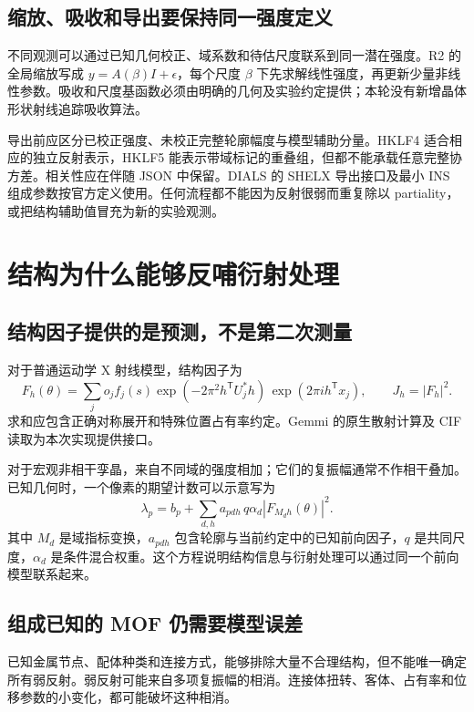 \documentclass[UTF8,11pt,a4paper,fontset=fandol]{ctexart}
\newcommand{\T}{^{\mathsf T}}
\begin{document}
\subsection{缩放、吸收和导出要保持同一强度定义}

不同观测可以通过已知几何校正、域系数和待估尺度联系到同一潜在强度。R2 的全局缩放写成 $y=A(\beta)I+\epsilon$，每个尺度 $\beta$ 下先求解线性强度，再更新少量非线性参数。吸收和尺度基函数必须由明确的几何及实验约定提供；本轮没有新增晶体形状射线追踪吸收算法。

导出前应区分已校正强度、未校正完整轮廓幅度与模型辅助分量。HKLF4 适合相应的独立反射表示，HKLF5 能表示带域标记的重叠组，但都不能承载任意完整协方差。相关性应在伴随 JSON 中保留。DIALS 的 SHELX 导出接口及最小 INS 组成参数按官方定义使用\cite{dials-export}。任何流程都不能因为反射很弱而重复除以 partiality，或把结构辅助值冒充为新的实验观测。

\section{结构为什么能够反哺衍射处理}
\subsection{结构因子提供的是预测，不是第二次测量}

对于普通运动学 X 射线模型，结构因子为
\begin{equation}
 F_h(\theta)=\sum_j o_j f_j(s)
 \exp(-2\pi^2 h\T U_j^*h)\,
 \exp(2\pi i h\T x_j),\qquad J_h=|F_h|^2.
\end{equation}
求和应包含正确对称展开和特殊位置占有率约定。Gemmi 的原生散射计算及 CIF 读取为本次实现提供接口\cite{gemmi-scattering,gemmi-api}。

对于宏观非相干孪晶，来自不同域的强度相加；它们的复振幅通常不作相干叠加。已知几何时，一个像素的期望计数可以示意写为
\begin{equation}
 \lambda_p=b_p+\sum_{d,h}a_{pdh}\,q\alpha_d
 \left|F_{M_dh}(\theta)\right|^2.
\end{equation}
其中 $M_d$ 是域指标变换，$a_{pdh}$ 包含轮廓与当前约定中的已知前向因子，$q$ 是共同尺度，$\alpha_d$ 是条件混合权重。这个方程说明结构信息与衍射处理可以通过同一个前向模型联系起来。

\subsection{组成已知的 MOF 仍需要模型误差}

已知金属节点、配体种类和连接方式，能够排除大量不合理结构，但不能唯一确定所有弱反射。弱反射可能来自多项复振幅的相消。连接体扭转、客体、占有率和位移参数的小变化，都可能破坏这种相消。
\end{document}
